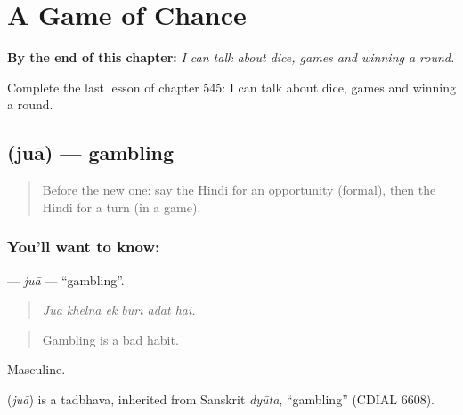 
\chapter{A Game of Chance}
\label{ch:hi-a-game-of-chance}

\begin{chapteropening}
\textbf{By the end of this chapter:} \emph{I can talk about dice, games and winning a round.}

Complete the last lesson of chapter 545: I can talk about dice, games and winning a round.
\end{chapteropening}

\section[\texorpdfstring{\hi{जुआ} (juā)}{जुआ (juā)}]{ (juā) — gambling}

\label{lesson:HI-C545-jua}



\begin{quote}
Before the new one: say the Hindi for an opportunity (formal), then the Hindi for a turn (in a game).
\end{quote}

\subsection*{You'll want to know: }
\textbf{} — \emph{juā} — \textquotedblleft{}gambling\textquotedblright{}.

\begin{quote}
     
\end{quote}

\begin{quote}
\emph{Juā khelnā ek burī ādat hai.}
\end{quote}

\begin{quote}
Gambling is a bad habit.
\end{quote}

Masculine.

\begin{cousinweb}
\textbf{} (\emph{juā}) is a tadbhava, inherited from Sanskrit \emph{dyūta}, \textquotedblleft{}gambling\textquotedblright{} (CDIAL 6608).
\end{cousinweb}

